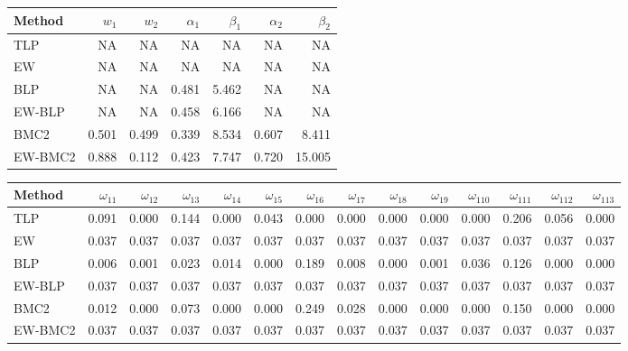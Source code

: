 \documentclass[
]{article}
\begin{document}
\begin{tabular}{lrrrrrr}
\toprule
Method & $w_1$ & $w_2$ & $\alpha_1$ & $\beta_1$ & $\alpha_2$ & $\beta_2$\\
\midrule
TLP & NA & NA & NA & NA & NA & NA\\
EW & NA & NA & NA & NA & NA & NA\\
BLP & NA & NA & 0.481 & 5.462 & NA & NA\\
EW-BLP & NA & NA & 0.458 & 6.166 & NA & NA\\
BMC2 & 0.501 & 0.499 & 0.339 & 8.534 & 0.607 & 8.411\\
EW-BMC2 & 0.888 & 0.112 & 0.423 & 7.747 & 0.720 & 15.005\\
\bottomrule
\end{tabular}

\begin{tabular}{lrrrrrrrrrrrrr}
\toprule
Method & $\omega_{11}$ & $\omega_{12}$ & $\omega_{13}$ & $\omega_{14}$ & $\omega_{15}$ & $\omega_{16}$ & $\omega_{17}$ & $\omega_{18}$ & $\omega_{19}$ & $\omega_{110}$ & $\omega_{111}$ & $\omega_{112}$ & $\omega_{113}$\\
\midrule
TLP & 0.091 & 0.000 & 0.144 & 0.000 & 0.043 & 0.000 & 0.000 & 0.000 & 0.000 & 0.000 & 0.206 & 0.056 & 0.000\\
EW & 0.037 & 0.037 & 0.037 & 0.037 & 0.037 & 0.037 & 0.037 & 0.037 & 0.037 & 0.037 & 0.037 & 0.037 & 0.037\\
BLP & 0.006 & 0.001 & 0.023 & 0.014 & 0.000 & 0.189 & 0.008 & 0.000 & 0.001 & 0.036 & 0.126 & 0.000 & 0.000\\
EW-BLP & 0.037 & 0.037 & 0.037 & 0.037 & 0.037 & 0.037 & 0.037 & 0.037 & 0.037 & 0.037 & 0.037 & 0.037 & 0.037\\
BMC2 & 0.012 & 0.000 & 0.073 & 0.000 & 0.000 & 0.249 & 0.028 & 0.000 & 0.000 & 0.000 & 0.150 & 0.000 & 0.000\\
EW-BMC2 & 0.037 & 0.037 & 0.037 & 0.037 & 0.037 & 0.037 & 0.037 & 0.037 & 0.037 & 0.037 & 0.037 & 0.037 & 0.037\\
\bottomrule
\end{tabular}
\end{document}
